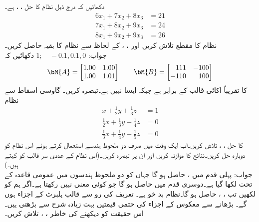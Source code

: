 \quad
دکھائیں کہ درج ذیل نظام کا حل ، ،  ہے۔
\begin{align*}
6x_1+7x_2+8x_3&=21\\
7x_1+8x_2+9x_3&=24\\
8x_1+9x_2+9x_3&=26
\end{align*}
نظام کا مقطع تلاش کریں اور ، ،  کے لحاظ سے نظام کا بقیہ حاصل کریں۔\\
جواب:\quad
$1;\quad -0.1,0.1,0$
\quad
دکھائیں کہ
\begin{align*}
\bM{A}=\begin{bmatrix}1.00&1.00\\1.00&1.01  \end{bmatrix}\quad\quad
\bM{B}=\begin{bmatrix*}[r]111&-100\\-110&100  \end{bmatrix*}
\end{align*}
کا  تقریباً اکائی قالب کے برابر ہے جبکہ  ایسا نہیں ہے۔تبصرہ کریں۔
\quad {}  \quad 
گاوسی اسقاط سے نظام
\begin{align*}
x+\tfrac{1}{2}y+\tfrac{1}{3}z&=1\\
\tfrac{1}{2}x+\tfrac{1}{3}y+\tfrac{1}{4}z&=0\\
\tfrac{1}{3}x+\tfrac{1}{4}y+\tfrac{1}{5}z&=0
\end{align*}
کا حل ، ،  تلاش کریں۔اب ایک وقت میں صرف دو ملحوظ ہندسے استعمال کرتے ہوئے اس نظام کو دوبارہ حل کریں۔نتائج کا موازنہ کریں اور ان پر تبصرہ کریں۔(اس نظام کے عددی سر قالب کو    کہتے ہیں۔)\\
جواب:\quad
پہلی قدم میں ،  حاصل ہو گا جہاں  کو دو ملحوظ ہندسوں میں عمومی قاعدہ کے تحت  لکھا گیا ہے۔دوسری قدم میں  حاصل ہو گا جو کوئی معنی نہیں رکھتا ہے۔اگر ہم  کو  لکھیں تب ، ،  حاصل ہو گا۔نظام بد خو ہے۔
\quad 
تعریف کی رو سے  قالب ہلبرٹ   کے اجزاء  ہوں گے۔ بڑھانے سے معکوس  کے اجزاء کی حتمی قیمتیں بہت زیادہ شرح سے بڑھتی ہیں۔اس حقیقت کو دیکھنے کی خاطر ، ، تلاش کریں۔

